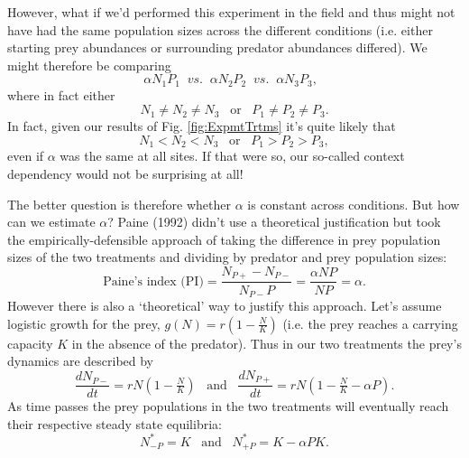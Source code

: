 \documentclass[10pt,letterpaper]{article}
\begin{document}
However, what if we'd performed this experiment in the field and thus might not have had the same population sizes across the different conditions (i.e. either starting prey abundances or surrounding predator abundances differed).  We might therefore be comparing
\begin{equation*}
\alpha N_1P_1 \;\;vs.\;\; \alpha N_2P_2 \;\; vs. \;\;\alpha N_3P_3, \;\;
\end{equation*}
where in fact either
\begin{equation*}
N_1 \neq N_2 \neq N_3 \;\;\; \text{or} \;\;\; P_1 \neq P_2 \neq P_3.
\end{equation*}
In fact, given our results of Fig. \ref{fig:ExpmtTrtms} it's quite likely that
\begin{equation*}
N_1 < N_2 < N_3 \;\;\; \text{or} \;\;\; P_1 > P_2 > P_3,
\end{equation*}
even if $\alpha$ was the same at all sites.  If that were so, our so-called context dependency would not be surprising at all!

The better question is therefore whether $\alpha$ is constant across conditions. But how can we estimate $\alpha$?  Paine (1992) didn't use a theoretical justification but took the empirically-defensible approach of taking the difference in prey population sizes of the two treatments and dividing by predator and prey population sizes:
\begin{equation}
\text{Paine's index (PI)}=\frac{N_{P+}-N_{P-}}{N_{P-} P} = \frac{\alpha N P}{NP}=\alpha.
\end{equation}
However there is also a `theoretical' way to justify this approach.  Let's assume logistic growth for the prey, $g(N)=r(1-\tfrac{N}{K})$ (i.e. the prey reaches a carrying capacity $K$ in the absence of the predator).  Thus in our two treatments the prey's dynamics are described by
\begin{equation}
	\frac{d N_{P-}}{d t} = rN\left(1-\tfrac{N}{K}\right)
	 \;\;\; \text{and} \;\;\; 	
	 \frac{d N_{P+}}{d t} = rN \left(1-\tfrac{N}{K} - \alpha P \right).
\end{equation}
As time passes the prey populations in the two treatments will eventually reach their respective steady state equilibria:
\begin{equation}
  N_{-P}^*=K  \;\;\; \text{and} \;\;\; N_{+P}^*=K-\alpha PK.
\end{equation}
\end{document}
